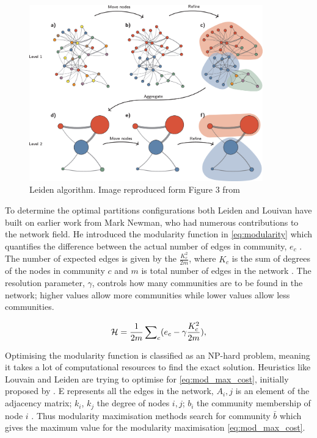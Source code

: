 \begin{figure}[!htb]    
    \centering
\includegraphics[width=0.9\textwidth,height=0.9\textheight,keepaspectratio]{Sections/Lit_review/Resources/Leiden_algorithm.png}
    \caption[Leiden algorithm]{Leiden algorithm. Image reproduced form Figure 3 from \citet{Traag2019-ne}}
    \label{fig:N_I:leiden-explained}
\end{figure}



To determine the optimal partitions configurations both Leiden and Louivan have built on earlier work from Mark Newman, who had numerous contributions to the network field. He introduced the modularity function in \cref{eq:modularity} which quantifies the difference between the actual number of edges in community, $e_c$ \citep{Newman2004-dd}. The number of expected edges is given by the $\frac{K_c^2}{2m}$, where $K_c$ is the sum of degrees of the nodes in community $c$ and $m$ is total number of edges in the network \citep{Traag2019-ne}. The resolution parameter, $\gamma$, controls how many communities are to be found in the network; higher values allow more communities while lower values allow less communities.


\begin{equation} \label{eq:modularity}
    {\mathcal H} =\frac{1}{2m}\,{\sum }_{c}({e}_{c}-{\rm{\gamma }}\frac{{K}_{c}^{2}}{2m}),
\end{equation}

Optimising the modularity function is classified as an NP-hard problem, meaning it takes a lot of computational resources to find the exact solution. Heuristics like Louvain and Leiden are trying to optimise for \cref{eq:mod_max_cost}, initially proposed by \cite{Newman2006-dn}. E represents all the edges in the network, $A_i,j$ is an element of the adjacency matrix; $k_i$, $k_j$ the degree of nodes $i,j$; $b_i$ the community membership of node $i$ \citep{Peixoto2023-se}. Thus modularity maximisation methods search for community $\bar{b}$ which gives the maximum value for the modularity maximisation \cref{eq:mod_max_cost}.

